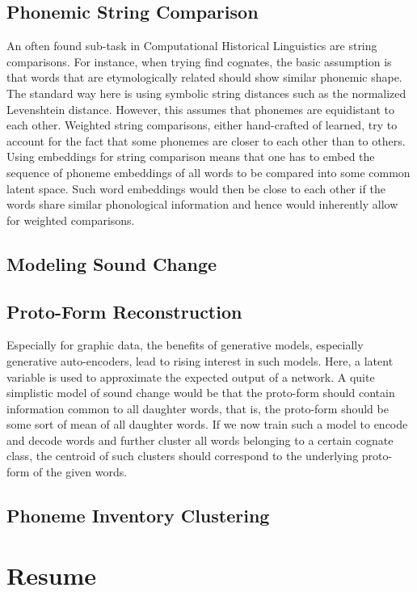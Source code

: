 \documentclass[11pt]{article}
\begin{document}
\subsection{Phonemic String Comparison}
An often found sub-task in Computational Historical Linguistics are string comparisons. For instance, when trying find cognates, the basic assumption is that words that are etymologically related should show similar phonemic shape. The standard way here is using symbolic string distances such as the normalized Levenshtein distance. However, this assumes that phonemes are equidistant to each other. Weighted string comparisons, either hand-crafted of learned, try to account for the fact that some phonemes are closer to each other than to others. 
Using embeddings for string comparison means that one has to embed the sequence of phoneme embeddings of all words to be compared into some common latent space. Such word embeddings would then be close to each other if the words share similar phonological information and hence would inherently allow for weighted comparisons. 
\subsection{Modeling Sound Change}
\subsection{Proto-Form Reconstruction}
Especially for graphic data, the benefits of generative models, especially generative auto-encoders, lead to rising interest in such models. Here, a latent variable is used to approximate the expected output of a network. A quite simplistic model of sound change would be that the proto-form should contain information common to all daughter words, that is, the proto-form should be some sort of mean of all daughter words. If we now train such a model to encode and decode words and further cluster all words belonging to a certain cognate class, the centroid of such clusters should correspond to the underlying proto-form of the given words.
\subsection{Phoneme Inventory Clustering}
\section{Resume}


 
\end{document}
